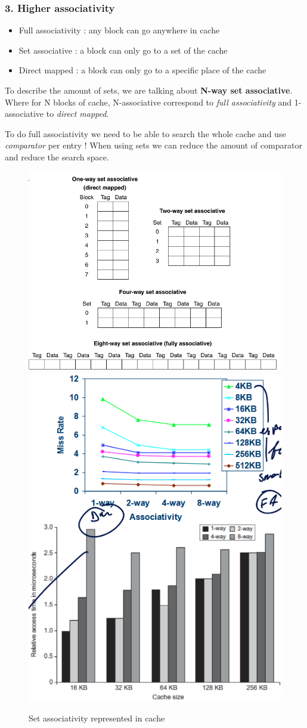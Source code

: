 \documentclass{report}
\begin{document}
\subsubsection{3. Higher associativity}

\begin{itemize}
    \item Full associativity : any block can go anywhere in cache
    \item Set associative : a block can only go to a set of the cache
    \item Direct mapped : a block can only go to a specific place of the cache
\end{itemize}

To describe the amount of sets, we are talking about \textbf{N-way set associative}. Where for N blocks of cache, N-associative correspond to \textit{full associativity} and 1-associative to \textit{direct mapped}.

To do full associativity we need to be able to search the whole cache and use \textit{comparator} per entry ! When using sets we can reduce the amount of comparator and reduce the search space. 

\begin{figure}[H]
    \centering
    \includegraphics[width=0.5\linewidth]{set_associativity_cache.png}
    \includegraphics[width=0.4\linewidth]{perf_set_associativity.png}
    \caption{Set associativity represented in cache}
    \label{fig:set-asso-label}
\end{figure}
\end{document}
